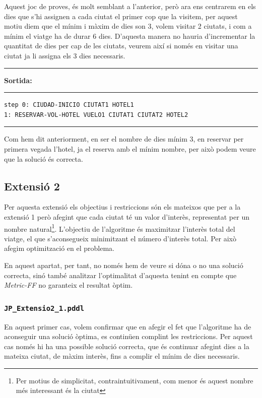 \documentclass[11pt,a4paper]{article}
\begin{document}
Aquest joc de proves, és molt semblant a l'anterior, però ara ens centrarem en els dies que s'hi assignen a cada ciutat el primer cop que la visitem, per aquest motiu diem que el mínim i màxim de dies son 3, volem visitar 2 ciutats, i com a mínim el viatge ha de durar 6 dies. D'aquesta manera no hauria d'incrementar la quantitat de dies per cap de les ciutats, veurem així si només en visitar una ciutat ja li assigna els 3 dies necessaris.

\begin{samepage}
\medskip
\noindent
\rule{0.1\textwidth}{0.5mm}
\textbf{Sortida:}
\rule{0.76\textwidth}{0.5mm}
\begin{verbatim}
step 0: CIUDAD-INICIO CIUTAT1 HOTEL1
1: RESERVAR-VOL-HOTEL VUELO1 CIUTAT1 CIUTAT2 HOTEL2
\end{verbatim}
\rule{\textwidth}{0.5mm}
\medskip
\end{samepage}

Com hem dit anteriorment, en ser el nombre de dies mínim 3, en reservar per primera vegada l'hotel, ja el reserva amb el mínim nombre, per això podem veure que la solució és correcta.

\subsection{Extensió 2}

Per aquesta extensió els objectius i restriccions són els mateixos que per a  la extensió 1 però afegint que cada ciutat té un valor d'interès, representat per un nombre natural\footnote{Per motius de simplicitat, contraintuitivament, com menor és aquest nombre més interessant és la ciutat}. L'objectiu de l'algoritme és maximitzar l'interès total del viatge, el que s'aconsegueix minimitzant el número d'interès total. Per això afegim optimització en el problema. 

En aquest apartat, per tant, no només hem de veure si dóna o no una solució correcta, sinó també analitzar l'optimalitat d'aquesta tenint en compte que \emph{Metric-FF} no garanteix el resultat òptim. 

\subsubsection*{\texttt{JP\_Extensio2\_1.pddl}}

En aquest primer cas, volem confirmar que en afegir el fet que l'algoritme ha de aconseguir una solució òptima, es continüen complint les restriccions. Per aquest cas només hi ha una possible solució correcta, que és continuar afegint dies a la mateixa ciutat, de màxim interès, fins a complir el mínim de dies necessaris.
\end{document}

